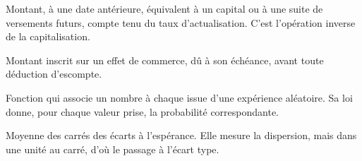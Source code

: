 Montant, à une date antérieure, équivalent à un capital ou à une suite de
versements futurs, compte tenu du taux d'actualisation. C'est l'opération
inverse de la capitalisation.

Montant inscrit sur un effet de commerce, dû à son échéance, avant toute
déduction d'escompte.

Fonction qui associe un nombre à chaque issue d'une expérience aléatoire. Sa
loi donne, pour chaque valeur prise, la probabilité correspondante.

Moyenne des carrés des écarts à l'espérance. Elle mesure la dispersion, mais
dans une unité au carré, d'où le passage à l'écart type.
